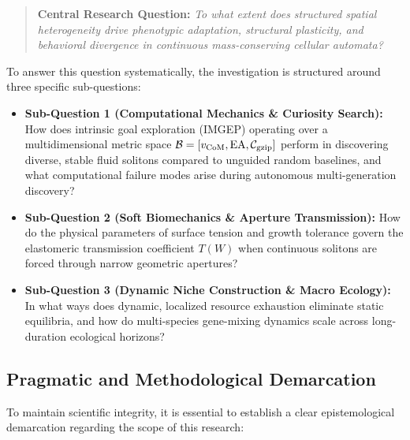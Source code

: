 \begin{quote}
\textbf{Central Research Question:} \textit{To what extent does structured spatial heterogeneity drive phenotypic adaptation, structural plasticity, and behavioral divergence in continuous mass-conserving cellular automata?}
\end{quote}

To answer this question systematically, the investigation is structured around three specific sub-questions:

\begin{itemize}
    \item \textbf{Sub-Question 1 (Computational Mechanics \& Curiosity Search):} How does intrinsic goal exploration (IMGEP) operating over a multidimensional metric space $\mathcal{B} = [v_{\text{CoM}}, \text{EA}, \mathcal{C}_{\text{gzip}}]$ perform in discovering diverse, stable fluid solitons compared to unguided random baselines, and what computational failure modes arise during autonomous multi-generation discovery?
    \item \textbf{Sub-Question 2 (Soft Biomechanics \& Aperture Transmission):} How do the physical parameters of surface tension and growth tolerance govern the elastomeric transmission coefficient $T(W)$ when continuous solitons are forced through narrow geometric apertures?
    \item \textbf{Sub-Question 3 (Dynamic Niche Construction \& Macro Ecology):} In what ways does dynamic, localized resource exhaustion eliminate static equilibria, and how do multi-species gene-mixing dynamics scale across long-duration ecological horizons?
\end{itemize}

\subsection{Pragmatic and Methodological Demarcation}
\label{subsec:intro_demarcation}

To maintain scientific integrity, it is essential to establish a clear epistemological demarcation regarding the scope of this research:

